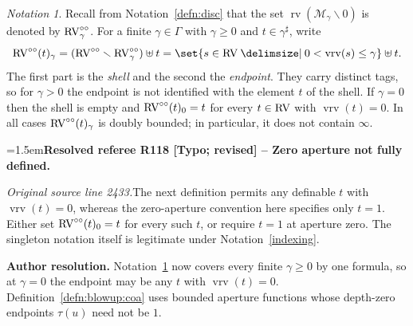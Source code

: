\documentclass[12pt]{amsart}
\newcommand{\ResolvedRefereeRemark}[5]{%
  \par\medskip\begingroup\normalfont\small\color{gray}%
  \emergencystretch=1.5em\noindent\textbf{Resolved referee R#1 [#2] -- #3.}\par\nobreak\noindent #4\par
  \medskip\color{ResolutionGreen}\noindent\textbf{Author resolution.} #5\par
  \endgroup\medskip
}
\newcommand{\memph}[1]{{\color{magenta}\emph{#1}}}
\theoremstyle{plain}
\theoremstyle{definition}
\theoremstyle{remark}
\newtheorem{nota}[thm]{Notation}
\numberwithin{equation}{section}
\theoremstyle{plain}
\newcommand{\RV}{\textup{RV}}
\newcommand{\MM}{\mdl M}
\newcommand{\0}{\emptyset}
\newcommand{\mdl}[1]{\mathcal{#1}}  %
\newcommand{\fun}{\longrightarrow}
\newcommand{\efun}{\longmapsto}
\newcommand{\mi}{\smallsetminus}
\providecommand\given{}
\newcommand\SetSymbol[1][]{%
\nonscript \: #1 \vert
\allowbreak
\nonscript\:
\mathopen{}}
\renewcommand\given{\SetSymbol[\delimsize]}
\DeclareMathOperator{\rv}{rv}
\DeclareMathOperator{\vrv}{vrv}
\newcommand{\ccirc}{\circ \circ}
\begin{document}
\begin{nota}\label{punc:RVd}
Recall from Notation~\ref{defn:disc} that the set $\rv(\MM_{\gamma} \mi 0)$ is denoted by $\RV^{\ccirc}_\gamma$. For a finite $\gamma \in \Gamma$ with $\gamma \geq 0$ and $t \in \gamma^\sharp$, write
\[
\RV^{\ccirc}(t)_\gamma = (\RV^{\ccirc} \mi \RV^{\ccirc}_\gamma) \uplus t = \set{s \in \RV \given 0 < \vrv(s) \leq \gamma} \uplus t.
\]
The first part is the \memph{shell} and the second the \memph{endpoint}. They carry distinct tags, so for $\gamma > 0$ the endpoint is not identified with the element $t$ of the shell. If $\gamma = 0$ then the shell is empty and $\RV^{\ccirc}(t)_0 = t$ for every $t \in \RV$ with $\vrv(t) = 0$. In all cases $\RV^{\ccirc}(t)_\gamma$ is doubly bounded; in particular, it does not contain $\infty$.

\ResolvedRefereeRemark{118}{Typo; revised}{Zero aperture not fully defined}{%
\textit{Original source line 2433.}\quad The next definition permits any definable $t$ with $\vrv(t)=0$, whereas the zero-aperture convention here specifies only $t=1$. Either set $\RV^{\ccirc}(t)_0=t$ for every such $t$, or require $t=1$ at aperture zero. The singleton notation itself is legitimate under Notation~\ref{indexing}.
}{Notation~\ref{punc:RVd} now covers every finite $\gamma\geq0$ by one formula, so at $\gamma=0$ the endpoint may be any $t$ with $\vrv(t)=0$. Definition~\ref{defn:blowup:coa} uses bounded aperture functions whose depth-zero endpoints $\tau(u)$ need not be $1$.}
\end{nota}

\end{document}
